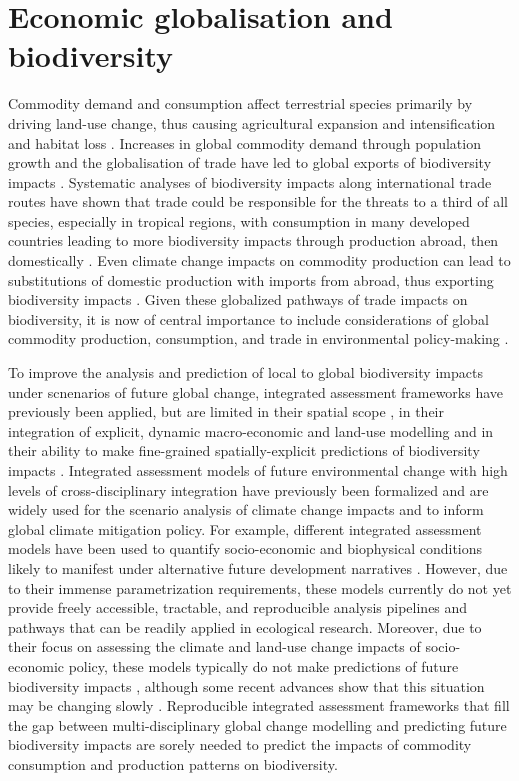 \documentclass[titlesmallcaps,copyrightpage]{uomthesis}\usepackage[]{graphicx}\usepackage[]{color}
\begin{document}
\section{Economic globalisation and biodiversity}
Commodity demand and consumption affect terrestrial species primarily by driving land-use change, thus causing agricultural expansion and intensification and habitat loss \citep{lambin_global_2011}. Increases in global commodity demand through population growth and the globalisation of trade have led to global exports of biodiversity impacts \citep{marques_increasing_2019, newbold_trouble_2019, kapitza_assessing_2021}. Systematic analyses of biodiversity impacts along international trade routes have shown that trade could be responsible for the threats to a third of all species, especially in tropical regions, with consumption in many developed countries leading to more biodiversity impacts through production abroad, then domestically \citep{lenzen_international_2012, marques_increasing_2019}. Even climate change impacts on commodity production can lead to substitutions of domestic production with imports from abroad, thus exporting biodiversity impacts \citep{kapitza_assessing_2021}. Given these globalized pathways of trade impacts on biodiversity, it is now of central importance to include considerations of global commodity production, consumption, and trade in environmental policy-making \citep{marques_increasing_2019}. 

To improve the analysis and prediction of local to global biodiversity impacts under scnenarios of future global change, integrated assessment frameworks have previously been applied, but are limited in their spatial scope \citep{kapitza_assessing_2021}, in their integration of explicit, dynamic macro-economic and land-use modelling \citep{newbold_future_2018} and in their ability to make fine-grained spatially-explicit predictions of biodiversity impacts \citep{leclere_bending_2020}. Integrated assessment models of future environmental change with high levels of cross-disciplinary integration have previously been formalized and are widely used for the scenario analysis of climate change impacts and to inform global climate mitigation policy. For example, different integrated assessment models have been used to quantify socio-economic and biophysical conditions likely to manifest under alternative future development narratives \citep{riahi_shared_2017}. However, due to their immense parametrization requirements, these models currently do not yet provide freely accessible, tractable, and reproducible analysis pipelines and pathways that can be readily applied in ecological research. Moreover, due to their focus on assessing the climate and land-use change impacts of socio-economic policy, these models typically do not make predictions of future biodiversity impacts \citep{hauck_reviewing_2015}, although some recent advances show that this situation may be changing slowly \citep{veerkamp_future_2020}. Reproducible integrated assessment frameworks that fill the gap between multi-disciplinary global change modelling and predicting future biodiversity impacts are sorely needed to predict the impacts of commodity consumption and production patterns on biodiversity.
\end{document}
